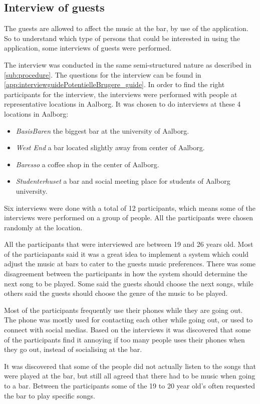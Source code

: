 \subsection{Interview of guests}
\label{userInterviews}

The guests are allowed to affect the music at the bar, by use of the application. So to understand which type of persons that could be interested in using the application, some interviews of guests were performed.

The interview was conducted in the same semi-structured nature as described in \cref{sub:procedure}. The questions for the interview can be found in \cref{app:interviewguidePotentielleBrugere_guide}. In order to find the right participants for the interview, the interviews were performed with people at representative locations in Aalborg. It was chosen to do interviews at these 4 locations in Aalborg:

\begin{itemize}
    \item \emph{BasisBaren} the biggest bar at the university of Aalborg.
    \item \emph{West End} a bar located slightly away from center of Aalborg.
    \item \emph{Baresso} a coffee shop in the center of Aalborg.
    \item \emph{Studenterhuset} a bar and social meeting place for students of Aalborg university.
\end{itemize}

Six interviews were done with a total of 12 participants, which means some of the interviews were performed on a group of people. All the participants were chosen randomly at the location.

All the participants that were interviewed are between 19 and 26 years old. Most of the particiapants said it was a great idea to implement a system which could adjust the music at bars to cater to the guests music preferences. There was some disagreement between the participants in how the system should determine the next song to be played. Some said the guests should choose the next songs, while others said the guests should choose the genre of the music to be played.

Most of the participants frequently use their phones while they are going out. The phone was mostly used for contacting each other while going out, or used to connect with social medias.
Based on the interviews it was discovered that some of the participants find it annoying if too many people uses their phones when they go out, instead of socialising at the bar.

It was discovered that some of the people did not actually listen to the songs that were played at the bar, but still all agreed that there had to be music when going to a bar. Between the participants some of the 19 to 20 year old's often requested the bar to play specific songs.
